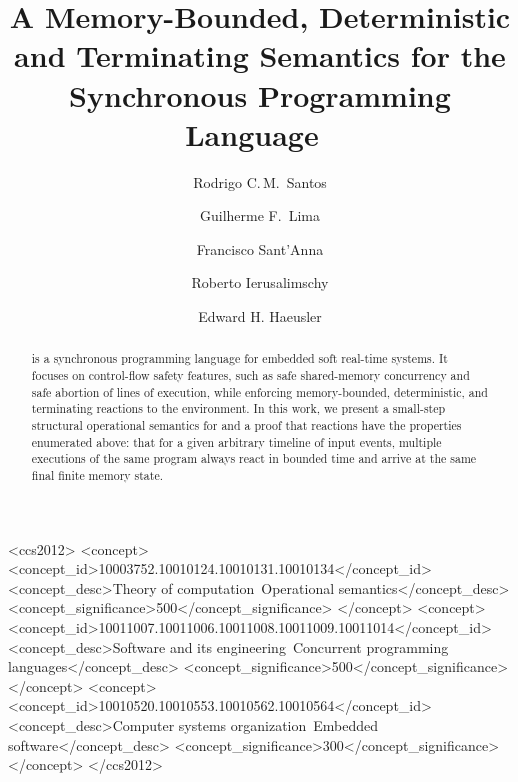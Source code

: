 \documentclass[sigplan,protrusion=true,expansion]{acmart}
\begin{document}
\title[A Memory-Bounded, Deterministic and Terminating Semantics for~\CEU]
{A Memory-Bounded, Deterministic and Terminating Semantics for the
       Synchronous Programming Language~\CEU}

\author[R.\,C.\,M.~Santos]{Rodrigo C.\,M.~Santos}
%
\author[G.\,F.~Lima]{Guilherme F.~Lima}
%
\author[F.~Sant'Anna]{Francisco Sant'Anna}
%
\author[R.~Ierusalimschy]{Roberto Ierusalimschy}
%
\author[E.\,H.~Haeusler]{Edward H. Haeusler}

\begin{abstract}
\CEU is a synchronous programming language for embedded soft real-time systems.
%
It focuses on control-flow safety features, such as safe shared-memory
concurrency and safe abortion of lines of execution, while enforcing
memory-bounded, deterministic, and terminating reactions to the environment.
%
In this work, we present a small-step structural operational semantics for
\CEU and a proof that reactions have the properties enumerated above:
%
that for a given arbitrary timeline of input events, multiple executions of the
same program always react in bounded time and arrive at the same final finite
memory state.
%
\end{abstract}


\begin{CCSXML}
<ccs2012>
 <concept>
  <concept_id>10003752.10010124.10010131.10010134</concept_id>
  <concept_desc>Theory of computation~Operational semantics</concept_desc>
  <concept_significance>500</concept_significance>
 </concept>
 <concept>
  <concept_id>10011007.10011006.10011008.10011009.10011014</concept_id>
  <concept_desc>Software and its
                engineering~Concurrent programming languages</concept_desc>
  <concept_significance>500</concept_significance>
 </concept>
 <concept>
  <concept_id>10010520.10010553.10010562.10010564</concept_id>
  <concept_desc>Computer systems
                organization~Embedded software</concept_desc>
  <concept_significance>300</concept_significance>
 </concept>
</ccs2012>
\end{CCSXML}

\maketitle







\balance



\appendix
\clearpage
\nobalance

\nobalance
\clearpage
\nobalance

\nobalance
\end{document}
